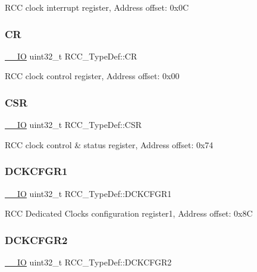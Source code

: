 R\+CC clock interrupt register, Address offset\+: 0x0C \mbox{\label{struct_r_c_c___type_def_abcb9ff48b9afb990283fefad0554b5b3}} 
\subsubsection{\texorpdfstring{CR}{CR}}
{\footnotesize\ttfamily \mbox{\hyperlink{core__sc300_8h_aec43007d9998a0a0e01faede4133d6be}{\+\_\+\+\_\+\+IO}} uint32\+\_\+t R\+C\+C\+\_\+\+Type\+Def\+::\+CR}

R\+CC clock control register, Address offset\+: 0x00 \mbox{\label{struct_r_c_c___type_def_a7e913b8bf59d4351e1f3d19387bd05b9}} 
\subsubsection{\texorpdfstring{CSR}{CSR}}
{\footnotesize\ttfamily \mbox{\hyperlink{core__sc300_8h_aec43007d9998a0a0e01faede4133d6be}{\+\_\+\+\_\+\+IO}} uint32\+\_\+t R\+C\+C\+\_\+\+Type\+Def\+::\+C\+SR}

R\+CC clock control \& status register, Address offset\+: 0x74 \mbox{\label{struct_r_c_c___type_def_a6199f13e9516c447219505bb92d5dd50}} 
\subsubsection{\texorpdfstring{DCKCFGR1}{DCKCFGR1}}
{\footnotesize\ttfamily \mbox{\hyperlink{core__sc300_8h_aec43007d9998a0a0e01faede4133d6be}{\+\_\+\+\_\+\+IO}} uint32\+\_\+t R\+C\+C\+\_\+\+Type\+Def\+::\+D\+C\+K\+C\+F\+G\+R1}

R\+CC Dedicated Clocks configuration register1, Address offset\+: 0x8C \mbox{\label{struct_r_c_c___type_def_ab93289a279c9809be3f93217722e4973}} 
\subsubsection{\texorpdfstring{DCKCFGR2}{DCKCFGR2}}
{\footnotesize\ttfamily \mbox{\hyperlink{core__sc300_8h_aec43007d9998a0a0e01faede4133d6be}{\+\_\+\+\_\+\+IO}} uint32\+\_\+t R\+C\+C\+\_\+\+Type\+Def\+::\+D\+C\+K\+C\+F\+G\+R2}

